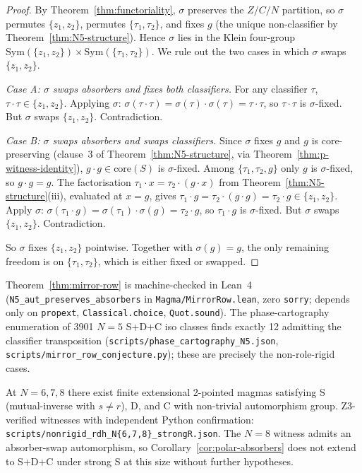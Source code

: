 \documentclass[sigconf,screen]{acmart}
\newcommand{\dotop}{\cdot}
\newcommand{\core}{\mathrm{core}}
\theoremstyle{remark}
\begin{document}
\begin{proof}
By Theorem~\ref{thm:functoriality}, $\sigma$ preserves the $Z/C/N$ partition, so $\sigma$ permutes $\{z_1, z_2\}$, permutes $\{\tau_1, \tau_2\}$, and fixes $g$ (the unique non-classifier by Theorem~\ref{thm:N5-structure}). Hence $\sigma$ lies in the Klein four-group $\mathrm{Sym}(\{z_1, z_2\}) \times \mathrm{Sym}(\{\tau_1, \tau_2\})$. We rule out the two cases in which $\sigma$ swaps $\{z_1, z_2\}$.

\emph{Case A: $\sigma$ swaps absorbers and fixes both classifiers.} For any classifier $\tau$, $\tau \dotop \tau \in \{z_1, z_2\}$. Applying $\sigma$: $\sigma(\tau \dotop \tau) = \sigma(\tau) \dotop \sigma(\tau) = \tau \dotop \tau$, so $\tau \dotop \tau$ is $\sigma$-fixed. But $\sigma$ swaps $\{z_1, z_2\}$. Contradiction.

\emph{Case B: $\sigma$ swaps absorbers and swaps classifiers.} Since $\sigma$ fixes $g$ and $g$ is core-preserving (clause~3 of Theorem~\ref{thm:N5-structure}, via Theorem~\ref{thm:p-witness-identity}), $g \dotop g \in \core(S)$ is $\sigma$-fixed. Among $\{\tau_1, \tau_2, g\}$ only $g$ is $\sigma$-fixed, so $g \dotop g = g$. The factorisation $\tau_1 \dotop x = \tau_2 \dotop (g \dotop x)$ from Theorem~\ref{thm:N5-structure}(iii), evaluated at $x = g$, gives $\tau_1 \dotop g = \tau_2 \dotop (g \dotop g) = \tau_2 \dotop g \in \{z_1, z_2\}$. Apply $\sigma$: $\sigma(\tau_1 \dotop g) = \sigma(\tau_1) \dotop \sigma(g) = \tau_2 \dotop g$, so $\tau_1 \dotop g$ is $\sigma$-fixed. But $\sigma$ swaps $\{z_1, z_2\}$. Contradiction.

So $\sigma$ fixes $\{z_1, z_2\}$ pointwise. Together with $\sigma(g) = g$, the only remaining freedom is on $\{\tau_1, \tau_2\}$, which is either fixed or swapped. \qedhere
\end{proof}

Theorem~\ref{thm:mirror-row} is machine-checked in Lean~4 (\texttt{N5\_aut\_preserves\_absorbers} in \texttt{Magma/MirrorRow.lean}, zero \texttt{sorry}; depends only on \texttt{propext}, \texttt{Classical.choice}, \texttt{Quot.sound}). The phase-cartography enumeration of 3901 $N\!=\!5$ S+D+C iso classes finds exactly 12 admitting the classifier transposition (\texttt{scripts/phase\_cartography\_N5.json}, \texttt{scripts/mirror\_row\_conjecture.py}); these are precisely the non-role-rigid cases.

\begin{proposition}
\label{prop:N6-nonrigid}
At $N = 6, 7, 8$ there exist finite extensional 2-pointed magmas satisfying S (mutual-inverse with $s \neq r$), D, and C with non-trivial automorphism group. Z3-verified witnesses with independent Python confirmation: \texttt{scripts/nonrigid\_rdh\_N\{6,7,8\}\_strongR.json}. The $N\!=\!8$ witness admits an absorber-swap automorphism, so Corollary~\ref{cor:polar-absorbers} does not extend to S+D+C under strong S at this size without further hypotheses.
\end{proposition}
\end{document}
